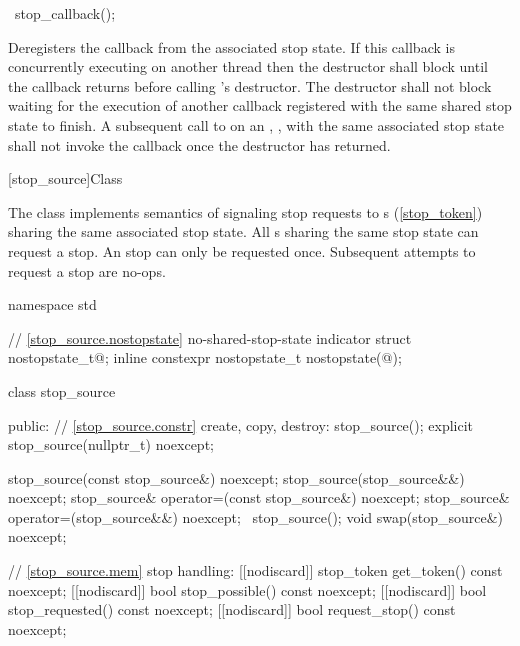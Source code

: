{%
\begin{itemdecl}
~stop_callback();
\end{itemdecl}
\begin{itemdescr}
  \pnum\effects Deregisters the callback from the associated stop state.
                If this callback is concurrently executing on another thread then the destructor shall
                block until the callback returns before calling 's destructor.
                The destructor shall not block waiting for the execution of another callback registered
                with the same shared stop state to finish.
                A subsequent call to  on an , , with the same
                associated stop state shall not invoke the callback once the destructor has returned.
\end{itemdescr}

%
[stop_source]{Class }

\pnum
{}%
The class  implements semantics of signaling stop requests
to s (\ref{stop_token}) sharing the same associated stop state.
All s sharing the same stop state can request a stop.
An stop can only be requested once. Subsequent attempts to request a stop are no-ops.

\begin{codeblock}
namespace std {
  // \ref{stop_source.nostopstate} no-shared-stop-state indicator
  struct nostopstate_t{@\seebelow@};
  inline constexpr nostopstate_t nostopstate(@\unspec@);

  class stop_source {
  public:
    // \ref{stop_source.constr} create, copy, destroy:
    stop_source();
    explicit stop_source(nullptr_t) noexcept;

    stop_source(const stop_source&) noexcept;
    stop_source(stop_source&&) noexcept;
    stop_source& operator=(const stop_source&) noexcept;
    stop_source& operator=(stop_source&&) noexcept;
    ~stop_source();
    void swap(stop_source&) noexcept;

    // \ref{stop_source.mem} stop handling:
    [[nodiscard]] stop_token get_token() const noexcept;
    [[nodiscard]] bool stop_possible() const noexcept;
    [[nodiscard]] bool stop_requested() const noexcept;
    [[nodiscard]] bool request_stop() const noexcept;

}}
\end{codeblock}}
